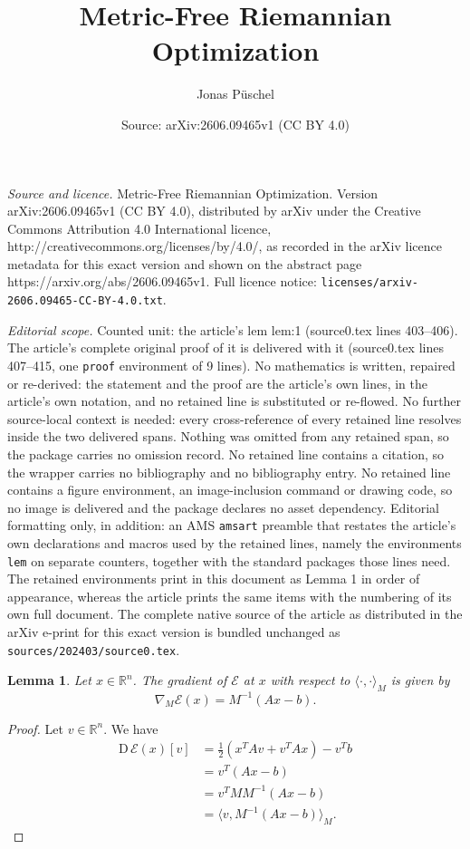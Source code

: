 \documentclass[10pt,a4paper]{amsart}
\title{Metric-Free Riemannian Optimization}
\author{Jonas P\"uschel}
\date{Source: arXiv:2606.09465v1 (CC BY 4.0)}
\newtheorem{lem}{Lemma}
\newcommand{\Drm}{\mathrm{D}\,}
\newcommand{\E}{\mathcal{E}}
\begin{document}
\maketitle

\noindent\emph{Source and licence.} Metric-Free Riemannian Optimization. Version arXiv:2606.09465v1 (CC BY 4.0), distributed by arXiv under the Creative Commons Attribution 4.0 International licence, http://creativecommons.org/licenses/by/4.0/, as recorded in the arXiv licence metadata for this exact version and shown on the abstract page https://arxiv.org/abs/2606.09465v1. Full licence notice: \texttt{licenses/arxiv-2606.09465-CC-BY-4.0.txt}.\par\smallskip

\noindent\textit{Editorial scope.} Counted unit: the article's lem lem:1 (source0.tex lines 403--406). The article's complete original proof of it is delivered with it (source0.tex lines 407--415, one \texttt{proof} environment of 9 lines). No mathematics is written, repaired or re-derived: the statement and the proof are the article's own lines, in the article's own notation, and no retained line is substituted or re-flowed.  No further source-local context is needed: every cross-reference of every retained line resolves inside the two delivered spans.  Nothing was omitted from any retained span, so the package carries no omission record.  No retained line contains a citation, so the wrapper carries no bibliography and no bibliography entry.  No retained line contains a figure environment, an image-inclusion command or drawing code, so no image is delivered and the package declares no asset dependency.  Editorial formatting only, in addition: an AMS \texttt{amsart} preamble that restates the article's own declarations and macros used by the retained lines, namely the environments \texttt{lem} on separate counters, together with the standard packages those lines need.  The retained environments print in this document as Lemma 1 in order of appearance, whereas the article prints the same items with the numbering of its own full document.  The complete native source of the article as distributed in the arXiv e-print for this exact version is bundled unchanged as \texttt{sources/202403/source0.tex}.
\begin{lem}\label{lem:1}
    Let $x \in \mathbb R^n$. The gradient of $\E$ at $x$ with respect to $\langle \cdot, \cdot\rangle_M$ is given by 
    $$\nabla_M \E(x) = M^{-1}(Ax-b).$$
\end{lem}

\begin{proof}
    Let $v \in \mathbb R^n$. We have
    \begin{align*}
        \Drm \E(x)[v] &= \frac{1}{2}(x^TAv + v^TAx) - v^Tb 
                \\&= v^T(Ax-b)
                \\&= v^T M M ^{-1} (Ax-b)
                \\&= \langle v, M ^{-1} (Ax-b)\rangle_M.
    \end{align*}
\end{proof}
\end{document}
